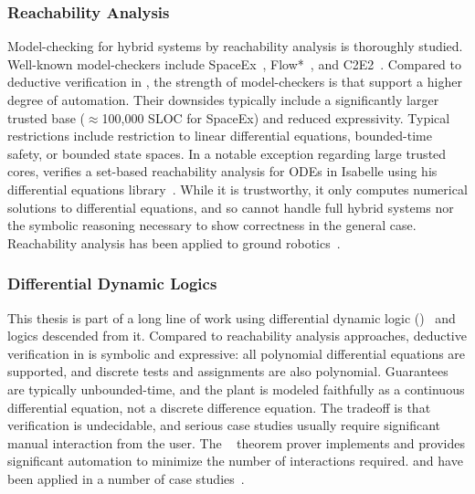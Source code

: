 \documentclass[12pt]{cmuthesis}
\theoremstyle{definition}
\theoremstyle{remark}
\begin{document}
%
%

\subsubsection{Reachability Analysis}
Model-checking for hybrid systems by reachability analysis is thoroughly studied.
Well-known model-checkers include SpaceEx~\cite{DBLP:conf/cav/FrehseGDCRLRGDM11}, Flow*~\cite{DBLP:conf/cav/ChenAS13}, and C2E2~\cite{DBLP:conf/tacas/DuggiralaMVP15}.
Compared to deductive verification in \dL, the strength of model-checkers is that support a higher degree of automation.
Their downsides typically include a significantly larger trusted base (${\approx}$100,000 SLOC for SpaceEx) and reduced expressivity.
Typical restrictions include restriction to linear differential equations, bounded-time safety, or bounded state spaces.
In a notable exception regarding large trusted cores, \cite{DBLP:conf/tacas/Immler15} verifies a set-based reachability analysis for ODEs in Isabelle using his differential equations library~\cite{DBLP:conf/itp/ImmlerT16}.
While it is trustworthy, it only computes numerical solutions to differential equations, and so cannot handle full hybrid systems nor the symbolic reasoning necessary to show correctness in the general case.
Reachability analysis has been applied to ground robotics~\cite{chen2015benchmark}.

\subsubsection{Differential Dynamic Logics}
This thesis is part of a long line of work using differential dynamic logic (\dL)~\cite{DBLP:journals/jar/Platzer08,DBLP:conf/lics/Platzer12a,DBLP:journals/jar/Platzer17} and logics descended from it.
Compared to reachability analysis approaches, deductive verification in \dL is symbolic and expressive: all polynomial differential equations are supported, and discrete tests and assignments are also polynomial.
Guarantees are typically unbounded-time, and the plant is modeled faithfully as a continuous differential equation, not a discrete difference equation.
The tradeoff is that verification is undecidable, and serious case studies usually require significant manual interaction from the user.
The \KeYmaeraX~\cite{DBLP:conf/cade/FultonMQVP15} theorem prover implements \dL and provides significant automation to minimize the number of interactions required.
\dL and \KeYmaeraX have been applied in a number of case studies~\cite{DBLP:conf/cade/Platzer16}.
\end{document}
